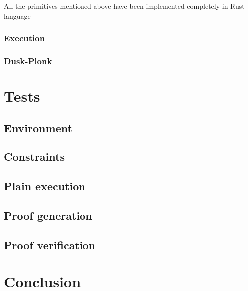 \documentclass[12pt, a4paper]{report}
\begin{document}
All the primitives mentioned above have been implemented completely in Rust language

\subsection{Execution}\label{subsec:execution}

\subsection{Dusk-Plonk}\label{subsec:duskplonk}

\chapter{Tests}\label{chap:tests}

\section{Environment}\label{sec:environment}

\section{Constraints}\label{sec:constraints}

\section{Plain execution}\label{sec:plain}

\section{Proof generation}\label{sec:proofgen}

\section{Proof verification}\label{sec:proofver}

\chapter{Conclusion}\label{chap:conclusion}

\nocite{*}
\printbibliography[heading=bibnumbered,title={References}]
\end{document}
